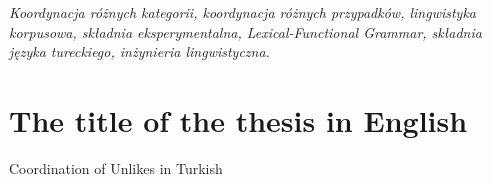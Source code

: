 \begin{small}
\textit{Koordynacja różnych kategorii, koordynacja różnych przypadków, lingwistyka korpusowa, składnia eksperymentalna, Lexical-Functional Grammar, składnia języka tureckiego, inżynieria lingwistyczna.}
\end{small}
\section*{The title of the thesis in English}
Coordination of Unlikes in Turkish
